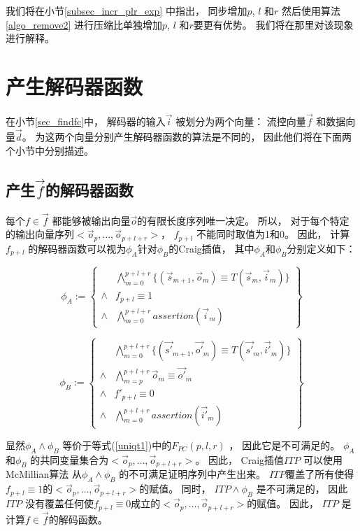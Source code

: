 我们将在小节\ref{subsec_incr_plr_exp} 中指出，
同步增加$p$, $l$ 和$r$ 然后使用算法\ref{algo_remove2} 进行压缩比单独增加$p$, $l$ 和$r$要更有优势。
我们将在那里对该现象进行解释。





\section{产生解码器函数}\label{sec_char}
在小节\ref{sec_findfc}中，
解码器的输入$\vec{i}$ 被划分为两个向量：
流控向量$\vec{f}$ 和数据向量$\vec{d}$。
为这两个向量分别产生解码器函数的算法是不同的，
因此他们将在下面两个小节中分别描述。

\subsection{产生$\vec{f}$的解码器函数}\label{subsec_fdec}

每个$f\in \vec{f}$ 都能够被输出向量$\vec{o}$的有限长度序列唯一决定。
所以，
对于每个特定的输出向量序列$<\vec{o}_p,\dots,\vec{o}_{p+l+r}>$，
$f_{p+l}$ 不能同时取值为1和0。
因此，
计算$f_{p+l}$ 的解码器函数可以视为$\phi_A$针对$\phi_B$的Craig插值，
其中$\phi_A$和$\phi_B$分别定义如下：

\begin{equation}\label{fa}
\phi_A:=
\left\{
\begin{array}{cc}
&\bigwedge_{m=0}^{p+l+r}
\{
(\vec{s}_{m+1},\vec{o}_m)\equiv T(\vec{s}_m,\vec{i}_m)
\}
\\
\wedge& f_{p+l}\equiv 1 \\
\wedge&\bigwedge_{m=0}^{p+l+r}assertion(\vec{i}_m)
\end{array}
\right\}
\end{equation}

\begin{equation}\label{fb}
\phi_B:=
\left\{
\begin{array}{cc}
&\bigwedge_{m=0}^{p+l+r}
\{
(\vec{s'}_{m+1},\vec{o'}_m)\equiv T(\vec{s'}_m,\vec{i'}_m)
\}
\\
\wedge&\bigwedge_{m=p}^{p+l+r}\vec{o}_m\equiv \vec{o'}_m \\
\wedge& f'_{p+l}\equiv 0 \\
\wedge&\bigwedge_{m=0}^{p+l+r}assertion(\vec{i'}_m)
\end{array}
\right\}
\end{equation}

显然$\phi_A\wedge \phi_B$ 等价于等式(\ref{uniqt1})中的$F_{PC}(p,l,r)$ ，
因此它是不可满足的。
$\phi_A$ 和$\phi_B$ 的共同变量集合为$<\vec{o}_p,\dots,\vec{o}_{p+l+r}>$。
因此，
Craig插值$ITP$ 可以使用McMillian算法 从$\phi_A\wedge \phi_B$ 的不可满足证明序列中产生出来。
$ITP$覆盖了所有使得$f_{p+l}\equiv 1$的$<\vec{o}_p,\dots,\vec{o}_{p+l+r}>$的赋值。
同时，
$ITP\wedge \phi_B$ 是不可满足的，
因此$ITP$ 没有覆盖任何使$f_{p+l}\equiv 0$成立的$<\vec{o}_p,\dots,\vec{o}_{p+l+r}>$的赋值。
因此，
$ITP$ 是计算$f\in\vec{f}$的解码函数。

